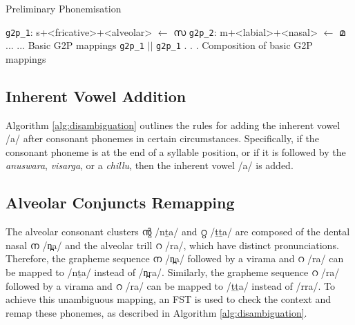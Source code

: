 \begin{algorithm}[htpb]
	\caption{Preliminary Phonemisation}\label{alg:tagging}
	\begin{algorithmic}[1]
		\State \texttt{g2p\_1}: {\ipa s+<fricative>+<alveolar>} $\gets$ {\mal സ}
		\State  \texttt{g2p\_2}: {\ipa m+<labial>+<nasal>} $\gets$ {\mal മ} 
		\State ...
		\State ... \Comment Basic G2P mappings
		\State \Return \texttt{g2p\_1} $||$ \texttt{g2p\_1} . . . 
  \State \Comment Composition of basic G2P mappings
	\EndProcedure
	\end{algorithmic}
\end{algorithm}



\subsection{Inherent Vowel Addition}

Algorithm \ref{alg:disambiguation} outlines the rules for adding the inherent vowel /a/ after consonant phonemes in certain circumstances. Specifically, if the consonant phoneme is at the end of a syllable position, or if it is followed by the \textit{anuswara}, \textit{visarga}, or a \textit{chillu}, then the inherent vowel /a/ is added.

\subsection{Alveolar Conjuncts Remapping}

The alveolar consonant clusters {\mal ന്റ} {\ipa /nṯa/} and {\mal റ്റ} {\ipa /ṯṯa/} are composed of the dental nasal {\mal ന} {\ipa /n̪a/} and the alveolar trill {\mal റ} {\ipa /ra/}, which have distinct pronunciations. Therefore, the grapheme sequence  {\mal ന} {\ipa /n̪a/} followed by a virama and {\mal റ} {\ipa /ra/} can be mapped to  {\ipa /nṯa/} instead of {\ipa /n̪ra/}. Similarly, the grapheme sequence {\mal റ} {\ipa /ra/} followed by a virama and {\mal റ} {\ipa /ra/} can be mapped to {\ipa /ṯṯa/} instead of {\ipa /rra/}. To achieve this unambiguous mapping, an FST is used to check the context and remap these phonemes, as described in Algorithm \ref{alg:disambiguation}.


